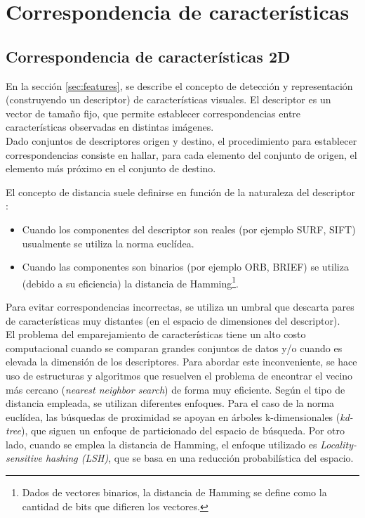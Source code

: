 \section{Correspondencia de características}

\subsection{Correspondencia de características 2D}
En la sección \ref{sec:features}, se describe el concepto de detección y representación (construyendo un descriptor) de características visuales. El descriptor es un vector de tamaño fijo, que permite establecer correspondencias entre características observadas en distintas imágenes. \\
Dado conjuntos de descriptores origen y destino, el procedimiento para establecer correspondencias consiste en hallar, para cada elemento del conjunto de origen, el elemento más próximo en el conjunto de destino.


El concepto de distancia suele definirse en función de la naturaleza del descriptor :
\begin{itemize}

\item Cuando los componentes del descriptor son reales (por ejemplo SURF, SIFT) usualmente se utiliza la norma euclídea.

\item Cuando las componentes son binarios (por ejemplo ORB, BRIEF) se utiliza (debido a su eficiencia) la distancia de Hamming\footnote{Dados de vectores binarios, la distancia de Hamming se define como la cantidad de bits que difieren los vectores.}.

\end{itemize}

Para evitar correspondencias incorrectas, se utiliza un umbral que descarta pares de características muy distantes (en el espacio de dimensiones del descriptor). \\

El problema del emparejamiento de características tiene un alto costo computacional cuando se comparan grandes conjuntos de datos y/o cuando es elevada la dimensión de los descriptores. Para abordar este inconveniente, se hace uso de estructuras y algoritmos que resuelven el problema de encontrar el vecino más cercano (\textit{nearest neighbor search}) de forma muy eficiente. Según el tipo de distancia empleada, se utilizan diferentes enfoques. Para el caso de la norma euclídea, las búsquedas de proximidad se apoyan en árboles k-dimensionales (\textit{kd-tree})\cite{wiki-kdtree}, que siguen un enfoque de particionado del espacio de búsqueda\cite{wiki-particionado-espacio}. Por otro lado, cuando se emplea la distancia de Hamming, el enfoque utilizado es \textit{Locality-sensitive hashing (LSH)}\cite{wiki-lsh}, que se basa en una reducción probabilística del espacio.

